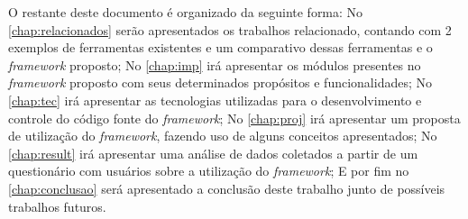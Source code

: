 O restante deste documento é organizado da seguinte forma:
No \autoref{chap:relacionados} serão apresentados os trabalhos relacionado, contando com 2 exemplos de ferramentas existentes e um comparativo dessas ferramentas e o \textit{framework} proposto;
No \autoref{chap:imp} irá apresentar os módulos presentes no \textit{framework} proposto com seus determinados propósitos e funcionalidades;
No \autoref{chap:tec} irá apresentar as tecnologias utilizadas para o desenvolvimento e controle do código fonte do \textit{framework};
No \autoref{chap:proj} irá apresentar um proposta de utilização do \textit{framework}, fazendo uso de alguns conceitos apresentados;
No \autoref{chap:result} irá apresentar uma análise de dados coletados a partir de um questionário com usuários sobre a utilização do \textit{framework};
E por fim no \autoref{chap:conclusao} será apresentado a conclusão deste trabalho junto de possíveis trabalhos futuros.